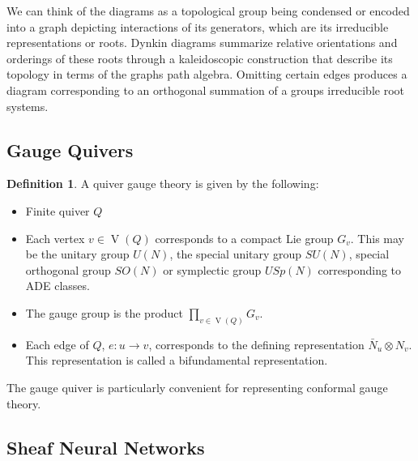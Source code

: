 \documentclass{article}
\theoremstyle{definition}
\newtheorem{definition}{Definition}[section]
\begin{document}
We can think of the diagrams as a topological group being condensed or encoded into a graph depicting interactions of its generators, which are its irreducible representations or roots. 
Dynkin diagrams summarize relative orientations and orderings of these roots through a kaleidoscopic construction that describe its topology in terms of the graphs path algebra.
Omitting certain edges produces a diagram corresponding to an orthogonal summation of a groups irreducible root systems.


\subsection{Gauge Quivers}
\label{sec:gauge-quiver}

\begin{definition}
    A quiver gauge theory is given by the following:
\begin{itemize}
    \item Finite quiver $Q$
    \item Each vertex  $v\in \operatorname {V} (Q)$ corresponds to a compact Lie group $G_{v}$. This may be the unitary group $U(N)$, the special unitary group $SU(N)$, special orthogonal group $SO(N)$ or symplectic group $USp(N)$ corresponding to ADE classes.
    \item The gauge group is the product $\textstyle \prod _{v\in \operatorname {V} (Q)}G_{v}$.
    \item Each edge of $Q$, $ e\colon u\to v$, corresponds to the defining representation ${\bar {N}}_{u}\otimes N_{v}$. This representation is called a bifundamental representation.
\end{itemize}
\end{definition}

The gauge quiver is particularly convenient for representing conformal gauge theory.


\subsection{Sheaf Neural Networks}
\label{sec:sheaf-nn}
\end{document}
